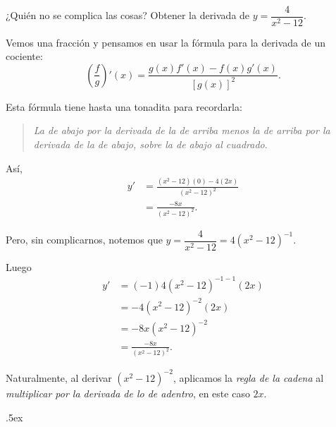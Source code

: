 \documentclass[12pt,letterpaper]{article}
\author{Manuel López Mateos}
\newcommand{\fej}{\relax\hfill\ifmmode{\lower.5ex\hbox{{\textcolor{blue}{\LARGE\smiley}}}}\else\lower.5ex\hbox{{\textcolor{blue}{\LARGE \smiley}}}}  %
\begin{document}
\ 
	\bigskip
	
\noindent ¿Quién no se  complica las cosas?
Obtener la derivada de $y=\dfrac{4}{x^2-12}$.

\medskip
Vemos una fracción y pensamos en usar la fórmula para la derivada de un cociente: 
$$\left(\frac{f}{g}\right)'(x)=\frac{g(x)f'(x)-f(x)g'(x)}{\left[g(x)\right]^2}.$$

\medskip
Esta fórmula tiene hasta una tonadita para recordarla: 

\begin{quotation}
\noindent\emph{La de abajo por la derivada de la de arriba menos la de arriba por la derivada de la de abajo, sobre la de abajo al cuadrado}.
\end{quotation}

Así, 
\begin{align*}
y'&=\frac{(x^2-12)(0)-4(2x)}{(x^2-12)^2}\\
&=\frac{-8x}{(x^2-12)^2}.
\end{align*}

Pero, sin complicarnos, notemos que $y=\dfrac{4}{x^2-12}=4(x^2-12)^{-1}$.

Luego
\begin{align*}
y'&=(-1)4(x^2-12)^{-1-1}(2x)\\
&=-4(x^2-12)^{-2}(2x)\\
&=-8x(x^2-12)^{-2}\\
&=\frac{-8x}{(x^2-12)^2}.
\end{align*}

Naturalmente, al derivar $(x^2-12)^{-2}$, aplicamos la \emph{regla de la cadena} al \emph{multiplicar por la derivada de lo de adentro}, en este caso $2x$. 

\fej
\end{document}
